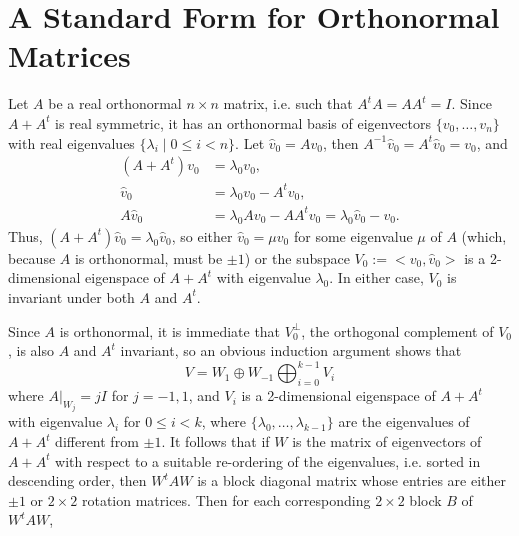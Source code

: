 \documentclass[12pt,leqno]{article}
\begin{document}
\appendix
\section{A Standard Form for Orthonormal Matrices}\label{ortho_std_form}
Let $A$ be a real orthonormal $n\times n$ matrix, i.e. such that $A^tA = AA^t = I$.  Since $A+A^t$ is real
symmetric, it has an  orthonormal basis of eigenvectors    $\{v_0,\dots,v_n\}$ with
real eigenvalues $\{\lambda_i \mid 0\le i < n\}$.
Let $\hat{v}_0 = Av_0$, then $A^{-1} \hat{v}_0 = A^t\hat{v}_0 = v_0$, and 
\begin{align*}
  (A + A^t)v_0 &= \lambda_0 v_0,\\
  \hat{v}_0 & = \lambda_0 v_0 - A^tv_0, \\
  A\hat{v}_0 &= \lambda_0 Av_0 - AA^tv_0 = \lambda_0 \hat{v}_0 - v_0.
\end{align*}
Thus, $(A+A^t)\hat{v}_0 = \lambda_0 \hat{v}_0$, so either $\hat{v}_0 = \mu v_0$ for some eigenvalue $\mu$ of $A$ (which, because $A$ is orthonormal, must be $\pm 1$) or the subspace $V_0:= <v_0,\hat{v}_0>$ is a 2-dimensional eigenspace of $A+A^t$ with eigenvalue $\lambda_0$.  In either case, $V_0$  is invariant under both $A$ and $A^t$.

Since $A$ is orthonormal, it is immediate that $V_0^{\perp}$,
the orthogonal complement of $V_0$, is also $A$ and $A^t$ invariant, so an obvious induction argument shows that
$$
V = W_1\oplus W_{-1} \bigoplus_{i=0}^{k-1} V_i
$$
where $A|_{W_j} = jI$ for $j = -1,1$, and $V_i$ is a 2-dimensional eigenspace of $A+A^t$ with eigenvalue $\lambda_i$
for $0\le i < k$, where $\{\lambda_0,\dots,\lambda_{k-1}\}$ are the eigenvalues of $A+A^t$ different
from $\pm 1$.  It follows that if $W$ is the matrix of eigenvectors of $A+A^t$ with respect to a suitable
re-ordering of the eigenvalues, i.e. sorted in descending order, then $W^tAW$ is a block diagonal matrix
whose entries are either $\pm 1$ or $2\times 2$ rotation matrices.  Then for each corresponding $2\times 2$
block $B$ of $W^tAW$,
\end{document}
